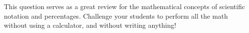 





This question serves as a great review for the mathematical concepts of scientific notation and percentages.  Challenge your students to perform all the math without using a calculator, and without writing anything!




